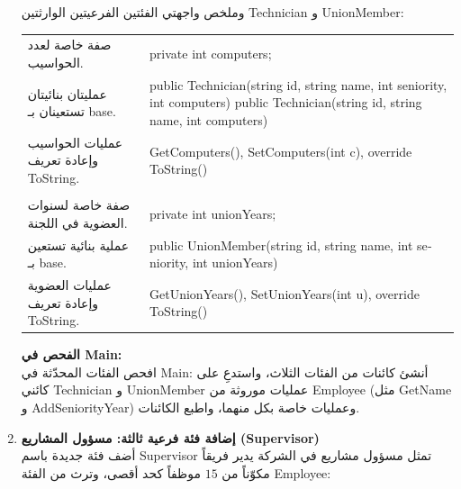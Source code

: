 \documentclass[14pt]{extarticle}
\begin{document}
\begin{enumerate}[label=\textbf{تمرين \arabic*:}, wide=0pt, itemsep=2.2em]
    \vspace{1em}
    وملخص واجهتي الفئتين الفرعيتين الوارثتين \textenglish{Technician} و \textenglish{UnionMember}:

    {\renewcommand{\arraystretch}{1.2}
    \small
    \begin{longtable}{|>{\raggedleft\arraybackslash}p{}|>{\raggedright\arraybackslash}p{}|}
    \hline
    \multicolumn{2}{|c|}{\textbf{الفئة الفرعية: \textenglish{Technician : Employee}}} \\
    \hline
    صفة خاصة لعدد الحواسيب. & \textenglish{private int computers;} \\
    \hline
    عمليتان بنائيتان تستعينان بـ \textenglish{base}. & \textenglish{public Technician(string id, string name, int seniority, int computers)} \newline \textenglish{public Technician(string id, string name, int computers)} \\
    \hline
    عمليات الحواسيب وإعادة تعريف \textenglish{ToString}. & \textenglish{GetComputers(), SetComputers(int c), override ToString()} \\
    \hline
    \multicolumn{2}{|c|}{\textbf{الفئة الفرعية: \textenglish{UnionMember : Employee}}} \\
    \hline
    صفة خاصة لسنوات العضوية في اللجنة. & \textenglish{private int unionYears;} \\
    \hline
    عملية بنائية تستعين بـ \textenglish{base}. & \textenglish{public UnionMember(string id, string name, int seniority, int unionYears)} \\
    \hline
    عمليات العضوية وإعادة تعريف \textenglish{ToString}. & \textenglish{GetUnionYears(), SetUnionYears(int u), override ToString()} \\
    \hline
    \end{longtable}}

    \vspace{1em}
    \textbf{الفحص في \textenglish{Main}:} \\
    افحص الفئات المحدّثة في \textenglish{Main}: أنشئ كائنات من الفئات الثلاث، واستدعِ على كائني \textenglish{Technician} و \textenglish{UnionMember} عمليات موروثة من \textenglish{Employee} (مثل \textenglish{GetName} و \textenglish{AddSeniorityYear}) وعمليات خاصة بكل منهما، واطبع الكائنات.
    \filbreak

    \item \textbf{إضافة فئة فرعية ثالثة: مسؤول المشاريع (\textenglish{Supervisor})} \\
    أضف فئة جديدة باسم \textenglish{Supervisor} تمثل مسؤول مشاريع في الشركة يدير فريقاً مكوّناً من $15$ موظفاً كحد أقصى، وترث من الفئة \textenglish{Employee}:


\end{enumerate}
\end{document}
